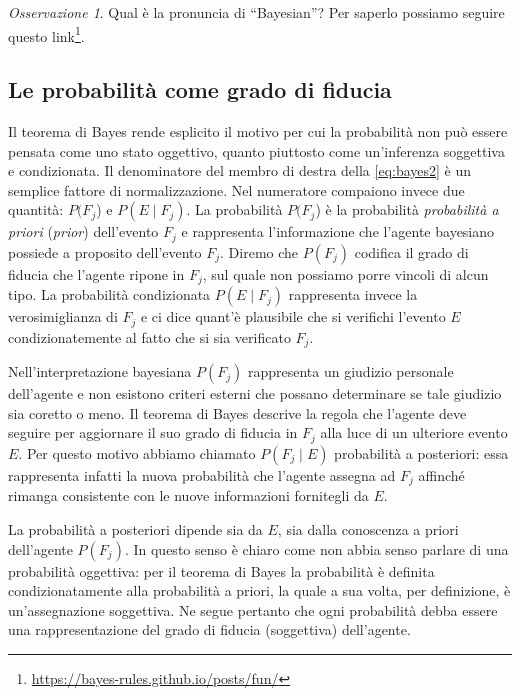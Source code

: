 \documentclass[
  11pt,
]{krantz}
\renewcommand{\href}[2]{#2\footnote{\url{#1}}}
\theoremstyle{definition}
\theoremstyle{definition}
\theoremstyle{definition}
\theoremstyle{definition}
\theoremstyle{remark}
\newtheorem*{remark}{Osservazione}
\begin{document}
\begin{remark}
Qual è la pronuncia di ``Bayesian''? Per saperlo possiamo seguire \href{https://bayes-rules.github.io/posts/fun/}{questo link}.
\end{remark}

\hypertarget{le-probabilita-come-grado-di-fiducia}{%
\subsection{Le probabilità come grado di fiducia}\label{le-probabilita-come-grado-di-fiducia}}

Il teorema di Bayes rende esplicito il motivo per cui la probabilità non può essere pensata come uno stato oggettivo, quanto piuttosto come un'inferenza soggettiva e condizionata. Il denominatore del membro di destra della \eqref{eq:bayes2} è un semplice fattore di normalizzazione. Nel numeratore compaiono invece due quantità: \(P(F_j\)) e \(P(E \mid F_j)\). La probabilità \(P(F_j\)) è la probabilità \emph{probabilità a priori} (\emph{prior}) dell'evento \(F_j\) e rappresenta l'informazione che l'agente bayesiano possiede a proposito dell'evento \(F_j\). Diremo che \(P(F_j)\) codifica il grado di fiducia che l'agente ripone in \(F_j\), sul quale non possiamo porre vincoli di alcun tipo. La probabilità condizionata \(P(E \mid F_j)\) rappresenta invece la verosimiglianza di \(F_j\) e ci dice quant'è plausibile che si verifichi l'evento \(E\) condizionatemente al fatto che si sia verificato \(F_j\).

Nell'interpretazione bayesiana \(P(F_j)\) rappresenta un giudizio personale dell'agente e non esistono criteri esterni che possano determinare se tale giudizio sia coretto o meno. Il teorema di Bayes descrive la regola che l'agente deve seguire per aggiornare il suo grado di fiducia in \(F_j\) alla luce di un ulteriore evento \(E\). Per questo motivo abbiamo chiamato \(P(F_j \mid E)\) probabilità a posteriori: essa rappresenta infatti la nuova probabilità che l'agente assegna ad \(F_j\) affinché rimanga consistente con le nuove informazioni fornitegli da \(E\).

La probabilità a posteriori dipende sia da \(E\), sia dalla conoscenza a priori dell'agente \(P(F_j)\). In questo senso è chiaro come non abbia senso parlare di una probabilità oggettiva: per il teorema di Bayes la probabilità è definita condizionatamente alla probabilità a priori, la quale a sua volta, per definizione, è un'assegnazione soggettiva. Ne segue pertanto che ogni probabilità debba essere una rappresentazione del grado di fiducia (soggettiva) dell'agente.
\end{document}
